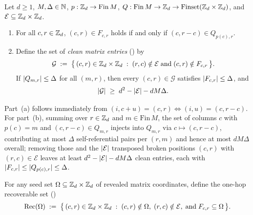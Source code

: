 \begin{lemma}\label{lem:clean-count}
Let $d \ge 1$, $M, \Delta \in \mathbb{N}$, $p : \mathbb{Z}_d \to \mathrm{Fin}\,M$,
$Q : \mathrm{Fin}\,M \to \mathbb{Z}_d \to \mathrm{Finset}(\mathbb{Z}_d \times \mathbb{Z}_d)$, and
$\mathcal{E} \subseteq \mathbb{Z}_d \times \mathbb{Z}_d$.
\begin{enumerate}[label=(\alph*)]
\item For all $c, r \in \mathbb{Z}_d$, $(c,r) \in F_{c,r}$ holds if and only if $(c, r - c) \in Q_{p(c),r}$.
\item Define the set of \emph{clean matrix entries} () by
  \[
    \mathcal{G} \;:=\; \bigl\{\,(c,r) \in \mathbb{Z}_d \times \mathbb{Z}_d \;:\;
      (r,c) \notin \mathcal{E} \;\text{and}\; (c,r) \notin F_{c,r}\,\bigr\}.
  \]
  If $\lvert Q_{m,r} \rvert \le \Delta$ for all $(m,r)$, then every $(c,r) \in \mathcal{G}$ satisfies
  $\lvert F_{c,r} \rvert \le \Delta$, and
  \[
    \lvert \mathcal{G} \rvert \;\ge\; d^2 - \lvert \mathcal{E} \rvert - d M \Delta.
  \]
\end{enumerate}
\end{lemma}
\begin{outline}
Part~(a) follows immediately from $(i, c + u) = (c, r) \iff (i, u) = (c, r - c)$. For part~(b),
summing over $r \in \mathbb{Z}_d$ and $m \in \mathrm{Fin}\,M$, the set of columns $c$ with $p(c) = m$ and
$(c, r-c) \in Q_{m,r}$ injects into $Q_{m,r}$ via $c \mapsto (c, r-c)$, contributing at most
$\Delta$ self-referential pairs per $(r,m)$ and hence at most $d M \Delta$ overall; removing those
and the $\lvert \mathcal{E} \rvert$ transposed broken positions $(c,r)$ with $(r,c) \in \mathcal{E}$ leaves
at least $d^2 - \lvert \mathcal{E} \rvert - d M \Delta$ clean entries, each with
$\lvert F_{c,r} \rvert \le \lvert Q_{p(c),r} \rvert \le \Delta$.
\end{outline}

For any seed set $\Omega \subseteq \mathbb{Z}_d \times \mathbb{Z}_d$ of revealed matrix coordinates, define the
one-hop recoverable set ()
\[
  \operatorname{Rec}(\Omega) \;:=\;
  \bigl\{\,(c,r) \in \mathbb{Z}_d \times \mathbb{Z}_d \;:\;
    (c,r) \notin \Omega,\; (r,c) \notin \mathcal{E},\;\text{and}\; F_{c,r} \subseteq \Omega\,\bigr\}.
\]

